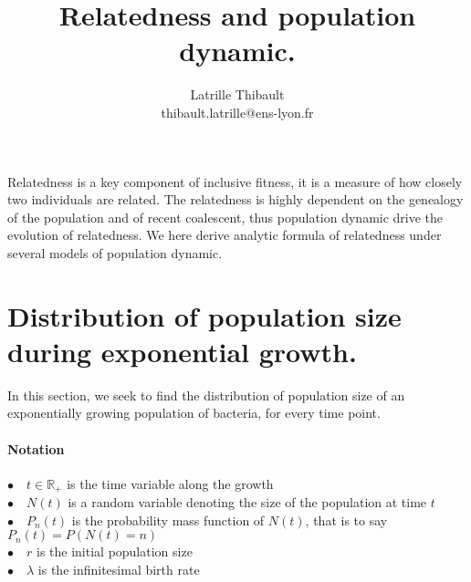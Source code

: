 \documentclass{article}
\author{Latrille Thibault\\
\small thibault.latrille@ens-lyon.fr\\[-0.8ex]}
\title{Relatedness and population dynamic.}
\begin{document}
\maketitle

Relatedness is a key component of inclusive fitness, it is a measure of how closely two individuals are related. The relatedness is highly dependent on the genealogy of the population and of recent coalescent, thus population dynamic drive the evolution of relatedness. We here derive analytic formula of relatedness under several models of population dynamic. 
\section{Distribution of population size during exponential growth.}

In this section, we seek to find the distribution of population size of an exponentially growing population of bacteria, for every time point.
 \paragraph{Notation} $ $\\
 $\bullet \quad t \in \mathbb{R}_+$ is the time variable along the growth\\
 $\bullet \quad N(t)$ is a random variable denoting the size of the population at time $t$\\
 $\bullet \quad P_n(t)$ is the probability mass function of $N(t)$, that is to say $P_n(t)=P(N(t)=n)$\\
 $\bullet \quad r$ is the initial population size\\
 $\bullet \quad \lambda$ is the infinitesimal birth rate\\
 
\end{document}
